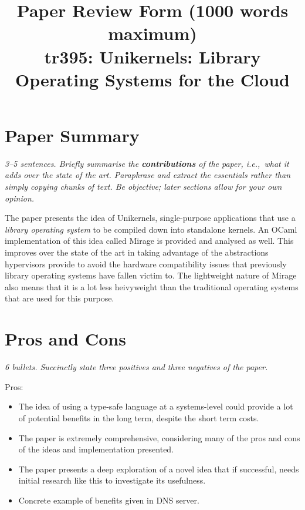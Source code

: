 \documentclass[11pt]{article}
\begin{document}
\title{Paper Review Form (1000 words maximum)\\
    tr395: Unikernels: Library Operating Systems for the Cloud \cite{Unikernels}}

\maketitle

\section*{Paper Summary}

\textsl{3--5 sentences. Briefly summarise the {\bf contributions} of the paper,
i.e.,~what it adds over the state of the art. Paraphrase and extract the
essentials rather than simply copying chunks of text. Be objective; later
sections allow for your own opinion.}

The paper presents the idea of Unikernels, single-purpose applications that use
a \textit{library operating system} to be compiled down into standalone
kernels. An OCaml implementation of this idea called Mirage is provided and
analysed as well. This improves over the state of the art in taking advantage
of the abstractions hypervisors provide to avoid the hardware compatibility
issues that previously library operating systems have fallen victim to. The
lightweight nature of Mirage also means that it is a lot less heivyweight than
the traditional operating systems that are used for this purpose.

\section*{Pros and Cons}

\textsl{6 bullets. Succinctly state three positives and three negatives of the
paper.}

Pros:

\begin{itemize}

    \item The idea of using a type-safe language at a systems-level could
    provide a lot of potential benefits in the long term, despite the short
    term costs.

    \item The paper is extremely comprehensive, considering many of the pros
    and cons of the ideas and implementation presented.

    \item The paper presents a deep exploration of a novel idea that if
    successful, needs initial research like this to investigate its usefulness.

    \item Concrete example of benefits given in DNS server.

\end{itemize}
\end{document}
